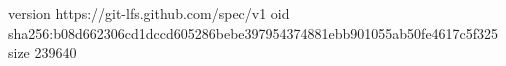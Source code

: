 version https://git-lfs.github.com/spec/v1
oid sha256:b08d662306cd1dccd605286bebe397954374881ebb901055ab50fe4617c5f325
size 239640
